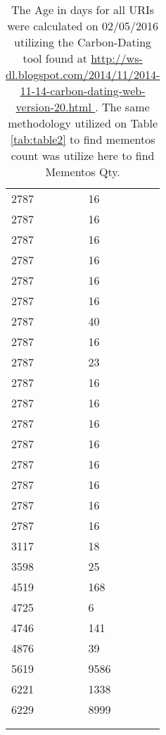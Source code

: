 \begin{table}[!htbp]
\begin{center}
\begin{minipage}{0.25\textwidth}
\begin{tabular}{|l | l|}
			2787 & 16\\
			2787 & 16\\
			2787 & 16\\
			2787 & 16\\
			2787 & 16\\
			2787 & 16\\
			2787 & 40\\
			2787 & 16\\
			2787 & 23\\
			2787 & 16\\
			2787 & 16\\
			2787 & 16\\
			2787 & 16\\
			2787 & 16\\
			2787 & 16\\
			2787 & 16\\
			2787 & 16\\
			3117 & 18\\
			3598 & 25\\
			4519 & 168\\
			4725 & 6\\
			4746 & 141\\
			4876 & 39\\
			5619 & 9586\\
			6221 & 1338\\
			6229 & 8999\\
			&\\
			&\\
			\hline
		\end{tabular}
	\end{minipage}	
	\caption*{\scriptsize The Age in days for all URIs were calculated on 02/05/2016 utilizing the Carbon-Dating tool found at 
	\url{http://ws-dl.blogspot.com/2014/11/2014-11-14-carbon-dating-web-version-20.html }. The same methodology utilized on Table \ref{tab:table2}
	 to find mementos count was utilize here to find Mementos Qty.}
	 \end{center}
\end{table}
\newpage
